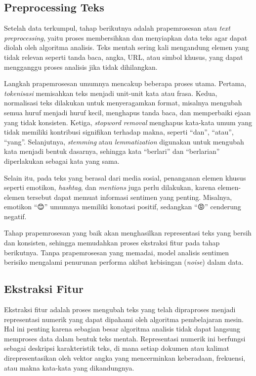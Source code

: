 \subsection{Preprocessing Teks}

Setelah data terkumpul, tahap berikutnya adalah prapemrosesan atau \textit{text preprocessing}, yaitu proses membersihkan dan menyiapkan data teks agar dapat diolah oleh algoritma analisis. Teks mentah sering kali mengandung elemen yang tidak relevan seperti tanda baca, angka, URL, atau simbol khusus, yang dapat mengganggu proses analisis jika tidak dihilangkan.

Langkah prapemrosesan umumnya mencakup beberapa proses utama. Pertama, \textit{tokenisasi} memisahkan teks menjadi unit-unit kata atau frasa. Kedua, normalisasi teks dilakukan untuk menyeragamkan format, misalnya mengubah semua huruf menjadi huruf kecil, menghapus tanda baca, dan memperbaiki ejaan yang tidak konsisten. Ketiga, \textit{stopword removal} menghapus kata-kata umum yang tidak memiliki kontribusi signifikan terhadap makna, seperti “dan”, “atau”, “yang”. Selanjutnya, \textit{stemming} atau \textit{lemmatization} digunakan untuk mengubah kata menjadi bentuk dasarnya, sehingga kata “berlari” dan “berlarian” diperlakukan sebagai kata yang sama.

Selain itu, pada teks yang berasal dari media sosial, penanganan elemen khusus seperti emotikon, \textit{hashtag}, dan \textit{mentions} juga perlu dilakukan, karena elemen-elemen tersebut dapat memuat informasi sentimen yang penting. Misalnya, emotikon “😊” umumnya memiliki konotasi positif, sedangkan “😡” cenderung negatif.

Tahap prapemrosesan yang baik akan menghasilkan representasi teks yang bersih dan konsisten, sehingga memudahkan proses ekstraksi fitur pada tahap berikutnya. Tanpa prapemrosesan yang memadai, model analisis sentimen berisiko mengalami penurunan performa akibat kebisingan (\textit{noise}) dalam data.

\subsection{Ekstraksi Fitur}

Ekstraksi fitur adalah proses mengubah teks yang telah dipraproses menjadi representasi numerik yang dapat dipahami oleh algoritma pembelajaran mesin. Hal ini penting karena sebagian besar algoritma analisis tidak dapat langsung memproses data dalam bentuk teks mentah. Representasi numerik ini berfungsi sebagai deskripsi karakteristik teks, di mana setiap dokumen atau kalimat direpresentasikan oleh vektor angka yang mencerminkan keberadaan, frekuensi, atau makna kata-kata yang dikandungnya.

